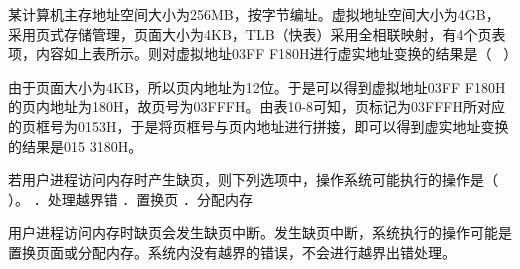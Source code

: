 某计算机主存地址空间大小为256MB，按字节编址。虚拟地址空间大小为4GB，采用页式存储管理，页面大小为4KB，TLB（快表）采用全相联映射，有4个页表项，内容如上表所示。则对虚拟地址03FF
F180H进行虚实地址变换的结果是（ ~）
\par{}
\begin{solution}由于页面大小为4KB，所以页内地址为12位。于是可以得到虚拟地址03FF
F180H的页内地址为180H，故页号为03FFFH。由表10-8可知，页标记为03FFFH所对应的页框号为0153H，于是将页框号与页内地址进行拼接，即可以得到虚实地址变换的结果是015
3180H。
\end{solution}
\question 若用户进程访问内存时产生缺页，则下列选项中，操作系统可能执行的操作是（
）。 ．处理越界错 ．置换页 ．分配内存
\par{}
\begin{solution}用户进程访问内存时缺页会发生缺页中断。发生缺页中断，系统执行的操作可能是置换页面或分配内存。系统内没有越界的错误，不会进行越界出错处理。
\end{solution}

